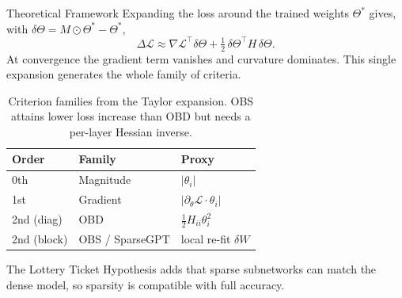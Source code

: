 \documentclass[final]{beamer}
\newlength{\onecolwid}
\newlength{\twocolwid}
\begin{document}
\begin{frame}[t]
\begin{columns}[t]
\begin{column}{\twocolwid}
\begin{columns}[t,totalwidth=\twocolwid]
\begin{column}{\onecolwid}\vspace{-.6in}
\begin{block}{Theoretical Framework}
Expanding the loss around the trained weights $\Theta^\ast$ gives, with
$\delta\Theta = M\odot\Theta^\ast-\Theta^\ast$,
\[
\Delta\mathcal{L} \approx
\nabla\mathcal{L}^{\!\top}\delta\Theta
+ \tfrac12\,\delta\Theta^{\!\top} H\,\delta\Theta .
\]
At convergence the gradient term vanishes and curvature dominates. This single
expansion generates the whole family of criteria.
\begin{table}
\renewcommand{\arraystretch}{1.25}
\small
\begin{tabularx}{\linewidth}{llX}
\toprule
\textbf{Order} & \textbf{Family} & \textbf{Proxy} \\
\midrule
0th & Magnitude & $|\theta_i|$ \\
1st & Gradient & $|\partial_\theta\mathcal{L}\cdot\theta_i|$ \\
2nd (diag) & OBD & $\tfrac12 H_{ii}\theta_i^2$ \\
2nd (block) & OBS / SparseGPT & local re-fit $\delta W$ \\
\bottomrule
\end{tabularx}
\caption{Criterion families from the Taylor expansion. OBS attains lower loss
increase than OBD but needs a per-layer Hessian inverse.}
\end{table}
The Lottery Ticket Hypothesis adds that sparse subnetworks can match the dense
model, so sparsity is compatible with full accuracy.
\end{block}
\end{column}


\end{columns}
\end{column}
\end{columns}
\end{frame}
\end{document}
